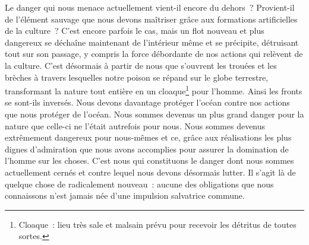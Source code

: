 
{\label{jonas-amérique2021}
Le danger qui nous menace actuellement vient-il encore du dehors~?
Provient-il de l'élément sauvage que nous devons maîtriser grâce aux
formations artificielles de la culture~? C'est encore parfois le cas,
mais un flot nouveau et plus dangereux se déchaîne maintenant de
l'intérieur même et se précipite, détruisant tout sur son passage, y
compris la force débordante de nos actions qui relèvent de la
culture. C'est désormais à partir de nous que s'ouvrent les trouées
et les brèches à travers lesquelles notre poison se répand sur le
globe terrestre, transformant la nature tout entière en un cloaque\footnote{Cloaque~: lieu très sale et malsain prévu pour recevoir les détritus de toutes sortes.}
pour l'homme. Ainsi les fronts se sont-ils inversés. Nous devons
davantage protéger l'océan contre nos actions que nous protéger de
l'océan. Nous sommes devenus un plus grand danger pour la nature que
celle-ci ne l'était autrefois pour nous. Nous sommes devenus
extrêmement dangereux pour nous-mêmes et ce, grâce aux réalisations
les plus dignes d'admiration que nous avons accomplies pour assurer
la domination de l'homme sur les choses. C'est nous qui constituons
le danger dont nous sommes actuellement cernés et contre lequel nous
devons désormais lutter. Il s'agit là de quelque chose de
radicalement nouveau~: aucune des obligations que nous connaissons
n'est jamais née d'une impulsion salvatrice commune.
}


